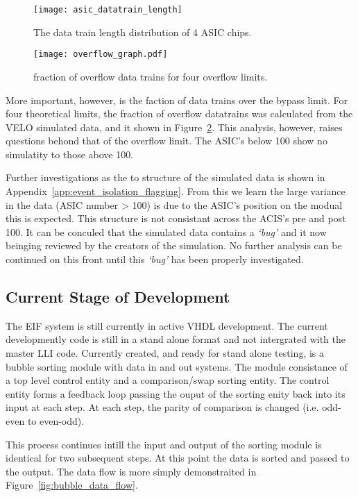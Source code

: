 		\begin{figure}[h]
			\centering
			\texttt{[image: asic\_datatrain\_length]}
			\caption{The data train length distribution of 4 ASIC chips.}
			\label{fig:asic_datatrain}
		\end{figure}
		\par
		\begin{figure}[h]
			\centering
			\texttt{[image: overflow\_graph.pdf]}
			\caption{fraction of overflow data trains for four overflow limits.}
			\label{fig:overflow_franction}
		\end{figure}
		More important, however, is the faction of data trains over the bypass limit.
		For four theoretical limits, the fraction of overflow datatrains was calculated from the VELO simulated data, and it shown in Figure~\ref{fig:overflow_franction}.
		This analysis, however, raises questions behond that of the overflow limit.
		The ASIC's below 100 show no simulatity to those above 100.
		\par
		Further investigations as the to structure of the simulated data is shown in Appendix~\ref{app:event_isolation_flagging}.
		From this we learn the large variance in the data (ASIC number > 100) is due to the ASIC's position on the modual this is expected.
		This structure is not consistant across the ACIS's pre and post 100.
		It can be conculed that the simulated data contains a \textit{`bug'} and it now beinging reviewed by the creators of the simulation. No further analysis can be continued on this front until this \textit{`bug'} has been properly investigated.


	\subsection{Current Stage of Development} 

		The EIF system is still currently in active VHDL development.
		The current developmently code is still in a stand alone format and not intergrated with the master LLI code.
		Currently created, and ready for stand alone testing, is a bubble sorting module with data in and out systems.
		The module consistance of a top level control entity and a comparison/swap sorting entity.
		The control entity forms a feedback loop passing the ouput of the sorting enity back into its input at each step.
		At each step, the parity of comparison is changed (i.e. odd-even to even-odd).
		\par
		This process continues intill the input and output of the sorting module is identical for two subsequent steps.
		At this point the data is sorted and passed to the output.
		The data flow is more simply demonstraited in Figure~\ref{fig:bubble_data_flow}.

